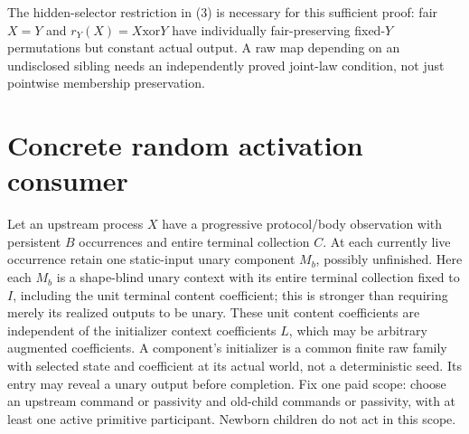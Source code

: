 \documentclass[11pt]{article}
\begin{document}
The hidden-selector restriction in (3) is necessary for this sufficient proof: fair $X=Y$ and $r_Y(X)=X\mathbin{\mathrm{xor}}Y$ have individually fair-preserving fixed-$Y$ permutations but constant actual output. A raw map depending on an undisclosed sibling needs an independently proved joint-law condition, not just pointwise membership preservation.


\section{Concrete random activation consumer}
Let an upstream process $X$ have a progressive protocol/body observation with persistent $B$ occurrences and entire terminal collection $C$. At each currently live occurrence retain one static-input unary component $M_b$, possibly unfinished. Here each $M_b$ is a shape-blind unary context with its entire terminal collection fixed to $I$, including the unit terminal content coefficient; this is stronger than requiring merely its realized outputs to be unary. These unit content coefficients are independent of the initializer context coefficients $L$, which may be arbitrary augmented coefficients. A component's initializer is a common finite raw family with selected state and coefficient at its actual world, not a deterministic seed. Its entry may reveal a unary output before completion. Fix one paid scope: choose an upstream command or passivity and old-child commands or passivity, with at least one active primitive participant. Newborn children do not act in this scope.
\end{document}
